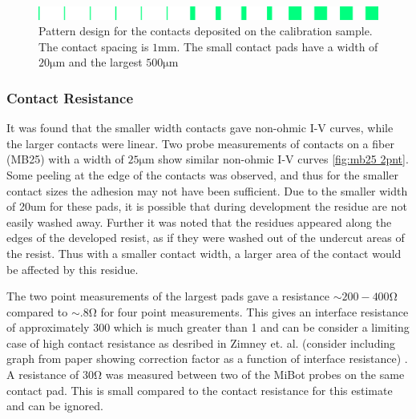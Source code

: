 \begin{figure}[!htb]
    \centering
    \includegraphics[width=\textwidth]{fig/Results/testwafer.png}
    \caption{Pattern design for the contacts deposited on the calibration sample. The contact spacing is $1\si{\mm}$. The small contact pads have a width of $20\si{\micro\meter}$ and the largest $500\si{\micro\meter}$  }
    \label{fig:testwafer}
\end{figure}

\subsubsection{Contact Resistance}
It was found that the smaller width contacts gave non-ohmic I-V curves, while the larger contacts were linear. Two probe measurements of contacts on a fiber (MB25) with a width of $ 25 \si{\micro\meter}$ show similar non-ohmic I-V curves \ref{fig:mb25 2pnt}. Some peeling at the edge of the contacts was observed, and thus for the smaller contact sizes the adhesion may not have been sufficient. Due to the smaller width of 20um for these pads, it is possible that during development the residue are not easily washed away. Further it was noted that the residues appeared along the edges of the developed resist, as if they were washed out of the undercut areas of the resist. Thus with a smaller contact width, a larger area of the contact would be affected by this residue. 



The two point measurements of the largest pads gave a resistance $\sim 200-400 \si{\ohm}$ compared to  $\sim .8 \si{\ohm}$ for four point measurements. This gives an interface resistance of approximately $300$ which is much greater than 1 and can be consider a limiting case of high contact resistance as desribed in Zimney et. al. (consider including graph from paper showing correction factor as a function of interface resistance) \cite{Zimney2007CorrectionStudy}. A resistance of $30 \si{\ohm}$ was measured between two of the MiBot probes on the same contact pad. This is small compared to the contact resistance for this estimate and can be ignored.  


